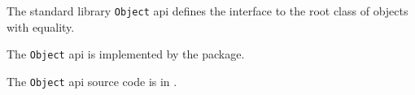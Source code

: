 
The standard library {\tt Object} api defines the interface to the root class of objects with 
equality.

The {\tt Object} api is implemented by the  package.

The {\tt Object} api source code is in .

